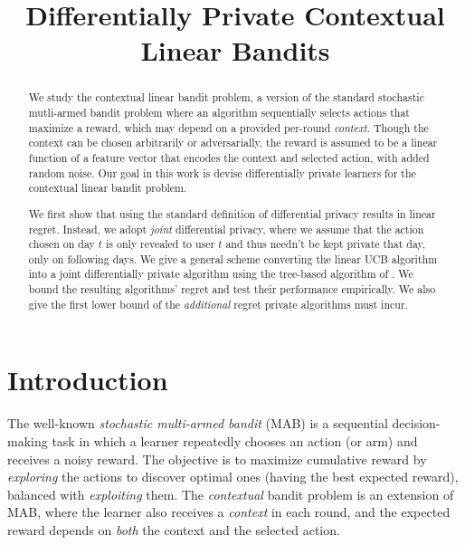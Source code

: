 \documentclass{article}
\title{Differentially Private Contextual Linear Bandits}
\begin{document}
\setlength{\intextsep}{4pt}
\setlength{\textfloatsep}{4pt}
\setlength{\abovedisplayskip}{3pt}
\setlength{\belowdisplayskip}{3pt}

\maketitle

\begin{abstract}
  We study the contextual linear bandit problem, a version of the
  standard stochastic mutli-armed bandit problem where an algorithm
  sequentially selects actions that maximize a reward, which may
  depend on a provided per-round \emph{context}. Though the context
  can be chosen arbitrarily or adversarially, the reward is assumed to
  be a linear function of a feature vector that encodes the
  context and selected action, with added random noise. Our goal in
  this work is devise differentially private learners for the
  contextual linear bandit problem.

  We first show that using the standard definition of differential
  privacy results in linear regret. Instead, we adopt \emph{joint}
  differential privacy, where we assume that the action chosen on day
  $t$ is only revealed to user $t$ and thus needn't be kept private
  that day, only on following days. We give a general scheme
  converting the linear UCB algorithm into a joint differentially
  private algorithm using the tree-based algorithm of
  \citet{ChanPrivateContinualRelease2010,DworkContinualObservation2010}.
  We bound the resulting algorithms' regret and test their performance
  empirically.  We also give the first lower bound of the
  \emph{additional} regret private algorithms must incur.
 \end{abstract}

\section{Introduction}
\label{sec:introduction}

The well-known \emph{stochastic multi-armed bandit} (MAB) is a
sequential decision-making task in which a learner repeatedly chooses
an action (or arm) and receives a noisy reward.  The objective is to
maximize cumulative reward by \emph{exploring} the actions to discover
optimal ones (having the best expected reward), balanced with
\emph{exploiting} them.  The \emph{contextual} bandit problem is an
extension of MAB, where the learner also receives a \emph{context} in
each round, and the expected reward depends on \emph{both} the context
and the selected action.
\end{document}
